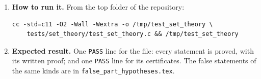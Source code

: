 \documentclass[11pt,a4paper]{article}
\begin{document}
\begin{enumerate}
\item \textbf{How to run it.} From the top folder of the repository:
\begin{verbatim}
cc -std=c11 -O2 -Wall -Wextra -o /tmp/test_set_theory \
    tests/set_theory/test_set_theory.c && /tmp/test_set_theory
\end{verbatim}

\item \textbf{Expected result.} One \texttt{PASS} line for the file: every statement is proved, with its written proof; and one \texttt{PASS} line for its certificates. The false statements of the same kinds are in \texttt{false\_part\_hypotheses.tex}.
\end{enumerate}
\end{document}
